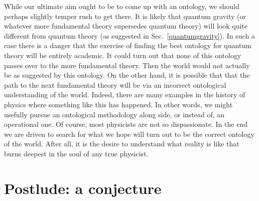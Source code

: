 \documentclass[10pt]{article}
\begin{document}
While our ultimate aim ought to be to come up with an ontology, we should perhaps slightly temper rush to get there.  It is likely that quantum gravity (or whatever more fundamental theory supersedes quantum theory) will look quite different from quantum theory (as suggested in Sec.\ \ref{quantumgravity}).  In such a case there is a danger that the exercise of finding the best ontology for quantum theory will be entirely academic.  It could turn out that none of this ontology passes over to the more fundamental theory.  Then the world would not actually be as suggested by this ontology.  On the other hand, it is possible that that the path to the next fundamental theory will be via an incorrect ontological understanding of the world.   Indeed, there are many examples in the history of physics where something like this has happened.  In other words, we might usefully pursue an ontological methodology along side, or instead of, an operational one.   Of course, most physicists are not so dispassionate.   In the end we are driven to search for what we hope will turn out to be the correct ontology of the world.  After all, it is the desire to understand what reality is like that burns deepest in the soul of any true physicist.




\newpage

\section*{Postlude: a conjecture}\label{conjecturesection}
\end{document}
